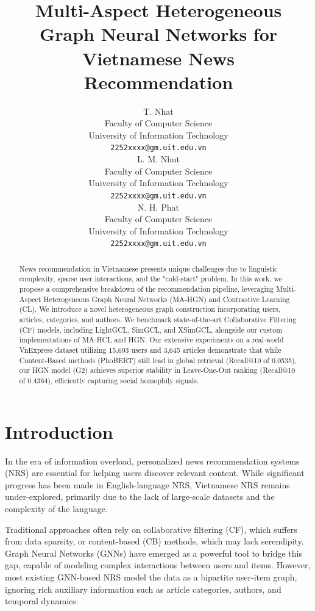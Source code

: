 \documentclass[11pt]{article}
\title{Multi-Aspect Heterogeneous Graph Neural Networks for \\ Vietnamese News Recommendation}
\author{T. Nhat \\
  Faculty of Computer Science \\
  University of Information Technology \\
  \texttt{2252xxxx@gm.uit.edu.vn} \\\And
  L. M. Nhut \\
  Faculty of Computer Science \\
  University of Information Technology \\
  \texttt{2252xxxx@gm.uit.edu.vn} \\\AND
  N. H. Phat \\
  Faculty of Computer Science \\
  University of Information Technology \\
  \texttt{2252xxxx@gm.uit.edu.vn}}
\begin{document}
\maketitle

\begin{abstract}
  News recommendation in Vietnamese presents unique challenges due to linguistic complexity, sparse user interactions, and the "cold-start" problem. In this work, we propose a comprehensive breakdown of the recommendation pipeline, leveraging Multi-Aspect Heterogeneous Graph Neural Networks (MA-HGN) and Contrastive Learning (CL). We introduce a novel heterogeneous graph construction incorporating users, articles, categories, and authors. We benchmark state-of-the-art Collaborative Filtering (CF) models, including LightGCL, SimGCL, and XSimGCL, alongside our custom implementations of MA-HCL and HGN. Our extensive experiments on a real-world VnExpress dataset utilizing 15,693 users and 3,645 articles demonstrate that while Content-Based methods (PhoBERT) still lead in global retrieval (Recall@10 of 0.0535), our HGN model (G2) achieves superior stability in Leave-One-Out ranking (Recall@10 of 0.4364), efficiently capturing social homophily signals.
\end{abstract}

\section{Introduction}

In the era of information overload, personalized news recommendation systems (NRS) are essential for helping users discover relevant content. While significant progress has been made in English-language NRS, Vietnamese NRS remains under-explored, primarily due to the lack of large-scale datasets and the complexity of the language.

Traditional approaches often rely on collaborative filtering (CF), which suffers from data sparsity, or content-based (CB) methods, which may lack serendipity. Graph Neural Networks (GNNs) have emerged as a powerful tool to bridge this gap, capable of modeling complex interactions between users and items. However, most existing GNN-based NRS model the data as a bipartite user-item graph, ignoring rich auxiliary information such as article categories, authors, and temporal dynamics.
\end{document}
